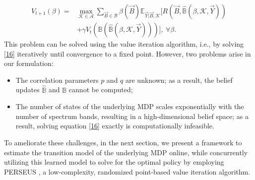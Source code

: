 \documentclass[10pt,twocolumn]{IEEEtran}
\begin{document}
\begin{align}\label{16}
\nonumber
        V_{t+1}(\beta) = &\max_{\mathcal{K} {\in} \mathcal{A}} \sum_{\vec{B} {\in} \mathcal{B}} \beta(\vec{B}) \mathbb{E}_{\vec{Y}|\vec{B}, \mathcal{K}} \Big[R(\vec{B}, \hat{\mathbb{B}}(\beta, \mathcal{K}, \vec{Y}))\\ &+\gamma V_{t}(\mathbb{B}(\hat{\mathbb{B}}(\beta, \mathcal{K}, \vec{Y})))\Big],\ \forall \beta.
\end{align}
This problem can be solved using the value iteration algorithm, i.e., by solving \eqref{16} iteratively until convergence to a fixed point. However, two problems arise in our formulation:
\begin{itemize}
\item The correlation parameters $p$ and $q$ are unknown; as a result, the belief updates 
$\hat{\mathbb B}$ and $\mathbb B$ cannot be computed;
\item The number of states of the underlying MDP scales exponentially with the number of spectrum bands, resulting in a high-dimensional belief space; as a result, solving equation \eqref{16} exactly is computationally infeasible.
\end{itemize}
To ameliorate these challenges, in the next section, we present a framework to estimate the transition model of the underlying MDP online, while concurrently utilizing this learned model to solve for the optimal policy by employing PERSEUS \cite{DBLP:journals/corr/abs-1109-2145}, a low-complexity, randomized point-based value iteration algorithm.
\vspace{-4mm}
\end{document}
